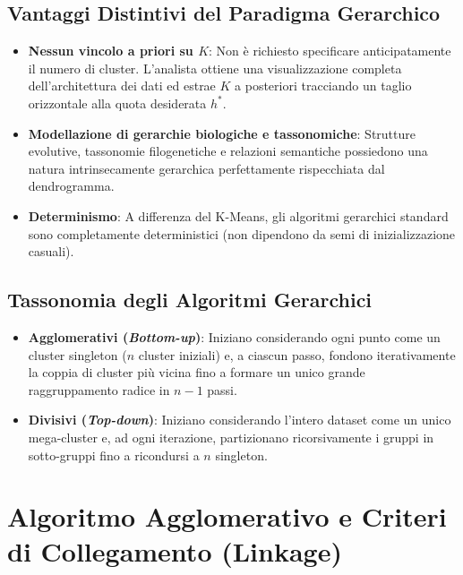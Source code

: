 \FloatBarrier
\subsection{Vantaggi Distintivi del Paradigma Gerarchico}

\begin{itemize}
    \item \textbf{Nessun vincolo a priori su $K$}: Non è richiesto specificare anticipatamente il numero di cluster. L'analista ottiene una visualizzazione completa dell'architettura dei dati ed estrae $K$ a posteriori tracciando un taglio orizzontale alla quota desiderata $h^*$.
    \item \textbf{Modellazione di gerarchie biologiche e tassonomiche}: Strutture evolutive, tassonomie filogenetiche e relazioni semantiche possiedono una natura intrinsecamente gerarchica perfettamente rispecchiata dal dendrogramma.
    \item \textbf{Determinismo}: A differenza del K-Means, gli algoritmi gerarchici standard sono completamente deterministici (non dipendono da semi di inizializzazione casuali).
\end{itemize}

\FloatBarrier
\subsection{Tassonomia degli Algoritmi Gerarchici}

\begin{itemize}
    \item \textbf{Agglomerativi (\textit{Bottom-up})}: Iniziano considerando ogni punto come un cluster singleton ($n$ cluster iniziali) e, a ciascun passo, fondono iterativamente la coppia di cluster più vicina fino a formare un unico grande raggruppamento radice in $n - 1$ passi.
    \item \textbf{Divisivi (\textit{Top-down})}: Iniziano considerando l'intero dataset come un unico mega-cluster e, ad ogni iterazione, partizionano ricorsivamente i gruppi in sotto-gruppi fino a ricondursi a $n$ singleton.
\end{itemize}

\FloatBarrier
\section{Algoritmo Agglomerativo e Criteri di Collegamento (Linkage)}
\label{sec:dm-agglomerative-linkage-criteria}

